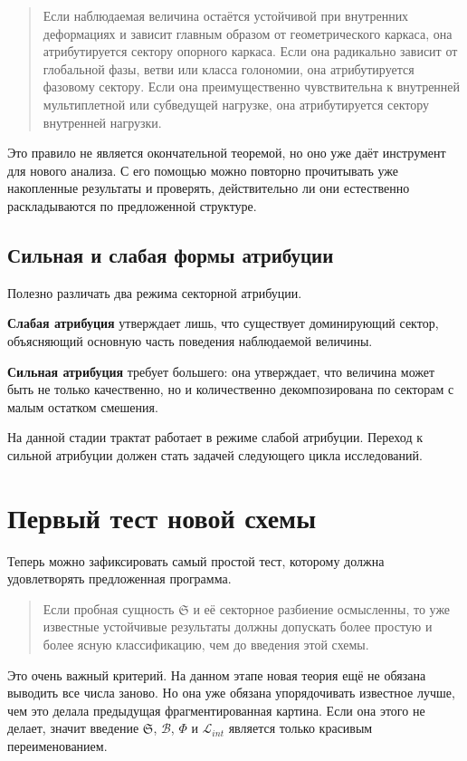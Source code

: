 \documentclass[12pt,a4paper]{article}
\begin{document}
\begin{quote}
Если наблюдаемая величина остаётся устойчивой при внутренних деформациях и зависит главным образом от геометрического каркаса, она атрибутируется сектору опорного каркаса. Если она радикально зависит от глобальной фазы, ветви или класса голономии, она атрибутируется фазовому сектору. Если она преимущественно чувствительна к внутренней мультиплетной или субведущей нагрузке, она атрибутируется сектору внутренней нагрузки.
\end{quote}

Это правило не является окончательной теоремой, но оно уже даёт инструмент для нового анализа. С его помощью можно повторно прочитывать уже накопленные результаты и проверять, действительно ли они естественно раскладываются по предложенной структуре.

\subsection{Сильная и слабая формы атрибуции}

Полезно различать два режима секторной атрибуции.

\textbf{Слабая атрибуция} утверждает лишь, что существует доминирующий сектор, объясняющий основную часть поведения наблюдаемой величины.

\textbf{Сильная атрибуция} требует большего: она утверждает, что величина может быть не только качественно, но и количественно декомпозирована по секторам с малым остатком смешения.

На данной стадии трактат работает в режиме слабой атрибуции. Переход к сильной атрибуции должен стать задачей следующего цикла исследований.

\section{Первый тест новой схемы}

Теперь можно зафиксировать самый простой тест, которому должна удовлетворять предложенная программа.

\begin{quote}
Если пробная сущность \(\mathfrak{S}\) и её секторное разбиение осмысленны, то уже известные устойчивые результаты должны допускать более простую и более ясную классификацию, чем до введения этой схемы.
\end{quote}

Это очень важный критерий. На данном этапе новая теория ещё не обязана выводить все числа заново. Но она уже обязана упорядочивать известное лучше, чем это делала предыдущая фрагментированная картина. Если она этого не делает, значит введение \(\mathfrak{S}\), \(\mathcal{B}\), \(\Phi\) и \(\mathcal{L}_{int}\) является только красивым переименованием.
\end{document}
